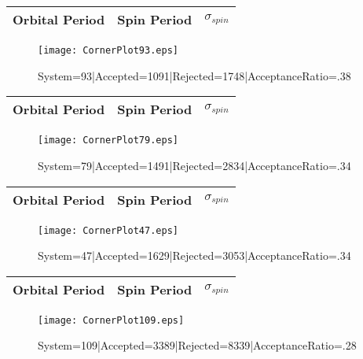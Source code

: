 \documentclass[10pt]{article}
\begin{document}
\begin{center}
        \begin{tabular}{|c|c|c|}
        \hline
Orbital Period & Spin Period & $\sigma_{spin}$ \\
 \hline
        \end{tabular}
        \end{center}
\begin{figure}[h] 
        \texttt{[image: CornerPlot93.eps]}
        \caption{System=93|Accepted=1091|Rejected=1748|AcceptanceRatio=.38}
        \label{S93}
        \centering
        \end{figure}
\begin{center}
        \begin{tabular}{|c|c|c|}
        \hline
Orbital Period & Spin Period & $\sigma_{spin}$ \\
 \hline
        \end{tabular}
        \end{center}
\begin{figure}[h] 
        \texttt{[image: CornerPlot79.eps]}
        \caption{System=79|Accepted=1491|Rejected=2834|AcceptanceRatio=.34}
        \label{S79}
        \centering
        \end{figure}
\begin{center}
        \begin{tabular}{|c|c|c|}
        \hline
Orbital Period & Spin Period & $\sigma_{spin}$ \\
 \hline
        \end{tabular}
        \end{center}
\begin{figure}[h] 
        \texttt{[image: CornerPlot47.eps]}
        \caption{System=47|Accepted=1629|Rejected=3053|AcceptanceRatio=.34}
        \label{S47}
        \centering
        \end{figure}
\begin{center}
        \begin{tabular}{|c|c|c|}
        \hline
Orbital Period & Spin Period & $\sigma_{spin}$ \\
 \hline
        \end{tabular}
        \end{center}
\begin{figure}[h] 
        \texttt{[image: CornerPlot109.eps]}
        \caption{System=109|Accepted=3389|Rejected=8339|AcceptanceRatio=.28}
        \label{S109}
        \centering
        \end{figure}
\end{document}
